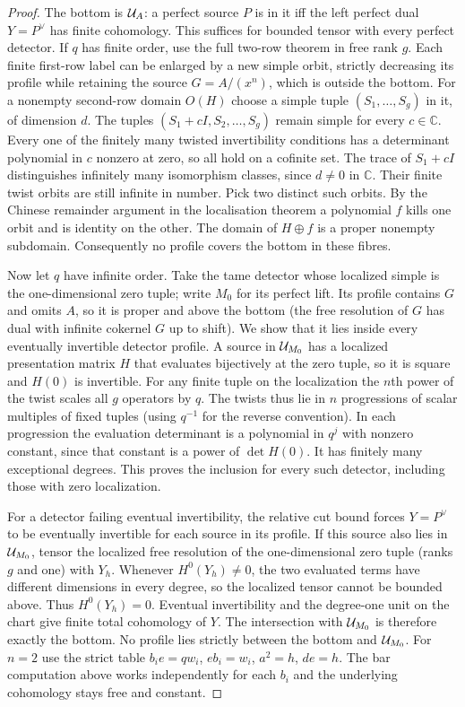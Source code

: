\documentclass[11pt]{article}
\begin{document}
\begin{proof}
The bottom is $\mathcal U_A$: a perfect source $P$ is in it iff the left
perfect dual $Y=P^\vee$ has finite cohomology. This suffices for
bounded tensor with every perfect detector. If $q$ has finite order,
use the full two-row theorem in free rank $g$. Each finite first-row label
can be enlarged by a new simple orbit, strictly decreasing its profile
while retaining the source $G=A/(x^n)$, which is outside the bottom.
For a nonempty second-row domain $O(H)$ choose a simple tuple
$(S_1,\ldots,S_g)$ in it, of dimension $d$. The tuples
$(S_1+cI,S_2,\ldots,S_g)$ remain simple for
every $c\in\mathbb C$. Every one of the finitely many twisted
invertibility conditions has a determinant polynomial in $c$ nonzero
at zero, so all hold on a cofinite set. The trace of $S_1+cI$ distinguishes
infinitely many isomorphism classes, since $d\ne0$ in $\mathbb C$.
Their finite twist orbits are still infinite in number. Pick two
distinct such orbits. By the Chinese remainder argument in the
localisation theorem a polynomial $f$ kills one orbit and is identity
on the other. The domain of $H\oplus f$ is a proper nonempty subdomain.
Consequently no profile covers the bottom in these fibres.

Now let $q$ have infinite order. Take the tame detector whose localized
simple is the one-dimensional zero tuple; write $M_0$ for its perfect lift.
Its profile contains $G$ and omits $A$, so it is proper and above
the bottom (the free resolution of $G$ has dual with infinite cokernel
$G$ up to shift). We show that it lies inside every eventually invertible
detector profile. A source in $\mathcal U_{M_0}$ has a localized presentation
matrix $H$ that evaluates bijectively at the zero tuple, so it is
square and $H(0)$ is invertible. For any finite tuple on the
localization the $n$th power of the twist scales all $g$ operators
by $q$. The twists thus lie in $n$ progressions of scalar multiples
of fixed tuples (using $q^{-1}$ for the reverse convention). In each progression
the evaluation determinant is a polynomial in $q^j$ with nonzero
constant, since that constant is a power of $\det H(0)$.
It has finitely many exceptional degrees. This proves the inclusion
for every such detector, including those with zero localization.

For a detector failing eventual invertibility, the relative cut bound
forces $Y=P^\vee$ to be eventually invertible for each source in its
profile. If this source also lies in $\mathcal U_{M_0}$, tensor the localized
free resolution of the one-dimensional zero tuple (ranks $g$ and one)
with $Y_h$. Whenever $H^0(Y_h)\ne0$, the two evaluated terms have
different dimensions in every degree, so the localized tensor cannot
be bounded above. Thus $H^0(Y_h)=0$. Eventual invertibility and the
degree-one unit on the chart give finite total cohomology of $Y$.
The intersection with $\mathcal U_{M_0}$ is therefore exactly the bottom.
No profile lies strictly between the bottom and $\mathcal U_{M_0}$.
For $n=2$ use the strict table $b_i e=q w_i$, $e b_i=w_i$,
$a^2=h$, $de=h$. The bar computation above works independently for
each $b_i$ and the underlying cohomology stays free and constant.
\end{proof}
\end{document}
